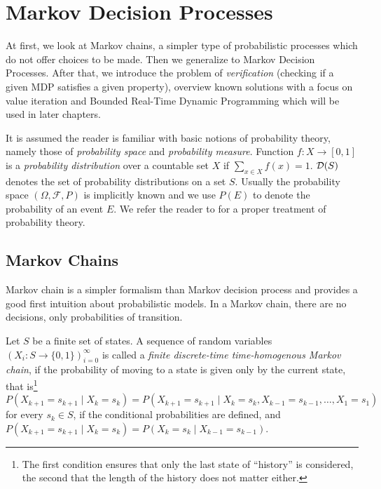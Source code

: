 \chapter{Markov Decision Processes}
\label{ch_mdp}

At first, we look at Markov chains, a simpler type of
probabilistic processes which do not offer choices to be made.
Then we generalize to Markov Decision Processes.
After that, we introduce the problem of {\em verification} (checking if a
given MDP satisfies a given property), overview known solutions with
a focus on value iteration and Bounded
Real-Time Dynamic Programming which will be used in later chapters.

It is assumed the reader is familiar with basic notions of probability
theory, namely those of {\em probability space} and {\em probability measure}.
Function $f : X \to [0,1]$ is a {\em probability distribution} over
a countable set $X$ if $\sum_{x \in X} f(x) = 1$.
$\mathcal{D}(S)$ denotes the
set of probability distributions on a set $S$.
Usually the probability space $(\Omega, \mathcal{F}, P)$
is implicitly known and we use $P(E)$ to
denote the probability of an event $E$.
We refer the reader to
\parencite{probability} for a proper treatment of probability theory.

\section{Markov Chains}

Markov chain is a simpler formalism than
Markov decision process and provides a good first intuition about
probabilistic models. In a Markov chain, there are no decisions, only
probabilities of transition.

\begin{definition}
    Let $S$ be a finite set of states.
    A sequence of random variables $(X_i : S \to \{0,1\})^{\infty}_{i=0}$
    is called a {\em finite discrete-time time-homogenous Markov chain},
    if the probability of moving to a state is given only by the
    current state, that is\footnote{The first condition ensures that
    only the last state of ``history'' is considered, the second that
    the length of the history does not matter either.}
    $P(X_{k+1} = s_{k+1} \mid X_k = s_k) =
    P(X_{k+1} = s_{k+1} \mid X_k = s_k, X_{k-1} = s_{k-1}, \ldots, X_{1} = s_{1})$
    for every $s_k \in S$,
    if the conditional probabilities are defined,
    and
    $P(X_{k+1} = s_{k+1} \mid X_k = s_k)
    = P(X_{k} = s_{k} \mid X_{k-1} = s_{k-1})$.
\end{definition}

